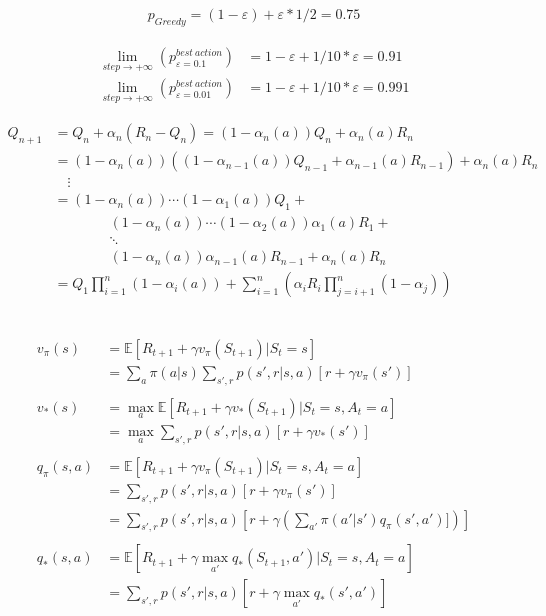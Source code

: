 \documentclass{article}
\begin{document}
\[
  \begin{aligned}
    p_{Greedy} = (1 - \varepsilon) + \varepsilon * 1/2 = 0.75
  \end{aligned}
\]

\[
  \begin{aligned}
    \lim\limits_{step\to+\infty} (p_{\varepsilon=0.1}^{best \ action}) &= 1 - \varepsilon + 1/10 * \varepsilon = 0.91 \\
    \lim\limits_{step\to+\infty} (p_{\varepsilon=0.01}^{best \ action}) &= 1 - \varepsilon + 1/10 * \varepsilon = 0.991
  \end{aligned}
\]

\[
  \begin{aligned}
    Q_{n+1} &= Q_{n} + \alpha_n (R_n - Q_n) = (1 - \alpha_n(a))Q_n + \alpha_n(a)R_n \\
            &= (1 - \alpha_n(a))((1 - \alpha_{n-1}(a))Q_{n-1} + \alpha_{n-1}(a)R_{n-1}) + \alpha_n(a)R_n\\
            & \quad \vdots\\
            &= (1 - \alpha_n(a))\cdots(1-\alpha_1(a))Q_1 + \\
            & \qquad \qquad (1 - \alpha_n(a))\cdots(1-\alpha_2(a))\alpha_1(a)R_1 + \\
            & \qquad \qquad \ddots\\
            & \qquad \qquad (1 - \alpha_n(a))\alpha_{n-1}(a)R_{n-1} + \alpha_n(a)R_n \\
            &= Q_1\prod^n_{i=1}(1 - \alpha_i(a)) + \sum^n_{i=1} (\alpha_iR_i \prod^n_{j=i+1}(1-\alpha_j))
  \end{aligned}
\]

\[
  \begin{aligned}
  \end{aligned}
\]

\[
  \begin{aligned}
  v_{\pi}(s) &= \mathbb{E}[R_{t+1} + \gamma v_{\pi}(S_{t+1}) | S_{t}=s] \\
  &= \sum_{a}\pi(a|s) \sum_{s',r}p(s',r|s,a)[r + \gamma v_{\pi}(s')]\\
  \\
  v_{*}(s) &= \max_{a}\mathbb{E}[R_{t+1} + \gamma v_{*}(S_{t+1}) | S_{t}=s, A_{t}=a]\\
  &= \max_{a}\sum_{s',r}p(s',r|s,a)[r + \gamma v_{*}(s')]\\
  \\
  q_{\pi}(s,a) &= \mathbb{E}[R_{t+1} + \gamma v_{\pi}(S_{t+1}) | S_{t}=s, A_{t}=a]\\
  &= \sum_{s',r}p(s',r|s,a)[r + \gamma v_{\pi}(s')]\\
  &= \sum_{s',r}p(s',r|s,a)[r + \gamma (\sum_{a'}\pi(a'|s') q_{\pi}(s',a')])]\\
  \\
  q_{*}(s,a) &= \mathbb{E}[R_{t+1} + \gamma \max_{a'}q_{*}(S_{t+1}, a') | S_{t}=s, A_{t}=a]\\
  &= \sum_{s',r}p(s',r|s,a)[r + \gamma \max_{a'}q_{*}(s', a')]
  \end{aligned}
\]
\end{document}
